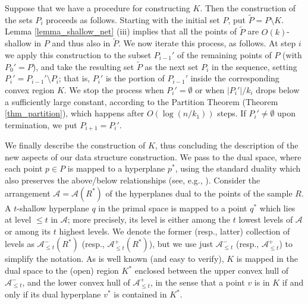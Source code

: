 \documentclass[11pt]{article}
\begin{document}
Suppose that we have a procedure for constructing $K$. Then the construction of the sets $P_{i}$ proceeds as follows. Starting with the initial set $P$, put $\tilde{P} = P \setminus K$. Lemma \ref{lemma_shallow_net} (iii) implies that all the points of $\tilde{P}$ are $O(k)$-shallow in $P$ and thus also in $\tilde{P}$. We now iterate this process, as follows. At step $i$ we apply this construction to the subset $P_{i-1}'$ of the remaining points of $P$ (with $P_{0}' = P$), and take the resulting set $\tilde{P}$ as the next set $P_{i}$ in the sequence, setting $P_{i}' = P_{i-1}' \setminus P_{i}$; that is, $P_{i}'$ is the portion of $P_{i-1}'$ inside the corresponding convex region $K$. We stop the process when $P_{i}' = \emptyset$ or when $|P_{i}'|/k_{i}$ drops below a sufficiently large constant, according to the Partition Theorem (Theorem \ref{thm_partition}), which happens after $O(\log(n/k_{1}))$ steps. If $P_{i}' \neq \emptyset$ upon termination, we put $P_{i+1} = P_{i}'$.

We finally describe the construction of $K$, thus concluding the description of the new aspects of our data structure construction. We pass to the dual space, where each point $p \in P$ is mapped to a hyperplane $p^{*}$, using the standard duality which also preserves the above/below relationships (see, e.g., \cite{ed87}). Consider the arrangement $\mathcal{A} = \mathcal{A}(R^{*})$ of the hyperplanes dual to the points of the sample $R$. A $t$-shallow hyperplane $q$ in the primal space is mapped to a point $q^{*}$ which lies at level $\leq t$ in $\mathcal{A}$; more precisely, its level is either among the $t$ lowest levels of $\mathcal{A}$ or among its $t$ highest levels. We denote the former (resp., latter) collection of levels as $\mathcal{A}^{-}_{\leq t}(R^{*})$ (resp., $\mathcal{A}^{+}_{\leq t}(R^{*})$), but we use just $\mathcal{A}^{-}_{\leq t}$ (resp., $\mathcal{A}^{+}_{\leq t}$) to simplify the notation. As is well known \cite{mat91b} (and easy to verify), $K$ is mapped in the dual space to the (open) region $K^{*}$ enclosed between the upper convex hull of $\mathcal{A}^{-}_{\leq t}$, and the lower convex hull of $\mathcal{A}^{+}_{\leq t}$, in the sense that a point $v$ is in $K$ if and only if its dual hyperplane $v^{*}$ is contained in $K^{*}$.
\end{document}
